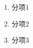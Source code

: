 \xiaosi 

\lipsum[1]

\begin{enumerate}
    \item 分项1
    \item 分项2
    \item 分项3
\end{enumerate}

\lipsum[1]